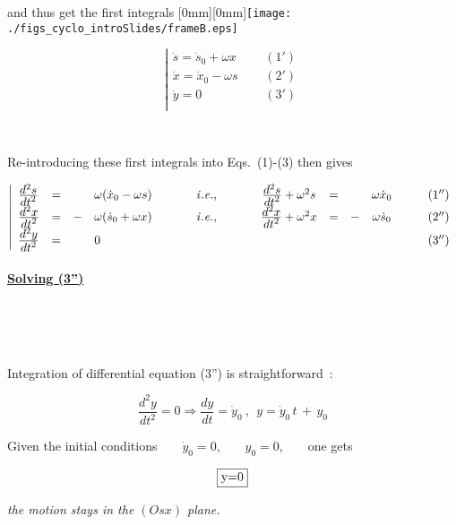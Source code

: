 \documentclass[12pt]{paper}
\newcommand{\nin}{\noindent}
\newcommand{\blue}{\color{blue}}
\begin{document}
and thus get the first integrals
   \hfill \raisebox{-30mm}[0mm][0mm]{\texttt{[image: ./figs\_cyclo\_introSlides/frameB.eps]}}



$$\left| 
\begin{array}{lcrccl} 
\dot s = \dot s_0 + \omega x  & ~ ~ ~ ~ ~ ~   (1') \\
\dot x = \dot x_0 - \omega s  & ~ ~ ~ ~ ~ ~   (2') \\
\dot y =0                      & ~ ~ ~ ~ ~ ~   (3') \\
\end{array} 
\right.$$

~

\nin Re-introducing these first integrals into Eqs.~(1)-(3) then gives 


$$\left| 
\begin{array}{lcclrcccrccr} 
\frac{\textstyle{d^2s}}{\textstyle{dt^2}} &=&  & \omega (\dot x_0 -\omega s)  & ~ ~ ~ ~ ~ & \it i.e., & ~ ~ ~ ~ ~ &  \frac{\textstyle{d^2s}}{\textstyle{dt^2}} + \omega^2 s &=&  & \omega \dot x_0 & ~ ~ ~ ~ ~ ~   (1'')\\
\frac{\textstyle{d^2x}}{\textstyle{dt^2}} &=& -& \omega (\dot s_0 + \omega x) && \it i.e., &  & \frac{\textstyle{d^2x}}{\textstyle{dt^2}}  +  \omega^2 x &=& -& \omega \dot s_0  &  (2'')\\
\frac{\textstyle{d^2y}}{\textstyle{dt^2}} &=&  &  0                           &&           &  &                                                          & &  &   &  (3'') \\
\end{array} 
\right.$$





\clearpage 


\paragraph{\underline{Solving (3'')}} ~ ~ ~ 

~

Integration of differential equation (3'') is straightforward~: 


$$\frac{\textstyle{d^2y}}{\textstyle{dt^2}} = 0 \Rightarrow \frac{\textstyle{dy}}{\textstyle{dt}}  =  \dot y_0  ~ , ~ ~  y =  \dot y_0 \, t \, + \, y_0  $$

Given the initial conditions ~ ~  $\dot y_0 = 0$, ~ ~  $y_0 = 0 $, ~ ~ one gets 

{\blue 
$$ \fbox{y=0} $$ 


\nin \textsl{the motion stays in the $(Osx)$ plane. }
}
\end{document}
